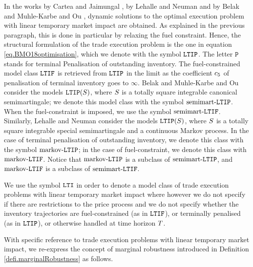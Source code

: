 \documentclass[10pt,a4paper]{article}
\begin{document}
In the works by Cartea and Jaimungal \cite{CJ16inc}, by Lehalle and Neuman \cite{LN19inc} and by Belak and Muhle-Karbe and Ou \cite{BMO18opt}, dynamic solutions to the optimal execution problem with linear temporary market impact are obtained. As explained in the previous  paragraph, this is done in particular by relaxing the fuel constraint. Hence, the structural formulation of the trade execution problem is the one in equation \eqref{eq.BMO18optimisation}, which we denote with the symbol $\mathtt{LTIP}$. The letter $\mathtt{P}$ stands for terminal Penalisation of outstanding inventory. The fuel-constrained model class $\mathtt{LTIF}$ is retrieved from $\mathtt{LTIP}$ in the limit as the coefficient $c_{5}$ of penalisation of terminal inventory goes to $\infty$.  Belak and Muhle-Karbe and Ou \cite{BMO18opt} consider  the models $\mathtt{LTIP}(S)$, where $S$ is a totally square integrable canonical semimartingale; we denote this model class with the symbol $\text{semimart-}\mathtt{LTIP}$. When the fuel-constraint is imposed, we use the symbol $\text{semimart-}\mathtt{LTIF}$. Similarly,  Lehalle and Neuman \cite{LN19inc} consider  the models $\mathtt{LTIP}(S)$, where $S$ is a totally square integrable special semimartingale and a continuous Markov process. In the case of terminal penalisation of outstanding inventory, we denote this class with the symbol $\text{markov-}\mathtt{LTIP}$; in the case of fuel-constraint, we denote this class with $\text{markov-}\mathtt{LTIF}$.  Notice that $\text{markov-}\mathtt{LTIP}$ is a subclass of $\text{semimart-}\mathtt{LTIP}$, and $\text{markov-}\mathtt{LTIF}$ is a subclass of $\text{semimart-}\mathtt{LTIF}$.

We use the symbol $\mathtt{LTI}$ in order to denote a model class of trade execution problems with linear temporary market impact where however we do not specify if there are restrictions to the price process and we do not specify whether the inventory trajectories are fuel-constrained (as in $\mathtt{LTIF}$), or terminally penalised (as in $\mathtt{LTIP}$), or otherwise handled at  time horizon $T$.

With specific reference to trade execution problems with linear temporary market impact, we re-express the concept of marginal robustness introduced in Definition \ref{defi.marginalRobustness}  as follows.
\end{document}
